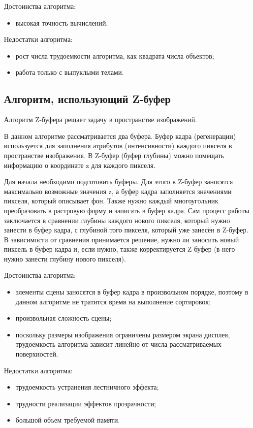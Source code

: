 Достоинства алгоритма:
\begin{itemize}
	\item высокая точность вычислений.
\end{itemize}

Недостатки алгоритма:
\begin{itemize}
	\item рост числа трудоемкости алгоритма, как квадрата числа объектов;
	\item работа только с выпуклыми телами.
\end{itemize}

\subsection{Алгоритм, использующий Z-буфер}

Алгоритм Z-буфера решает задачу в пространстве изображений. 

В данном алгоритме рассматривается два буфера. Буфер кадра (регенерации) используется для заполнения атрибутов (интенсивности) каждого пикселя в пространстве изображения. В Z-буфер (буфер глубины) можно помещать информацию о координате z для каждого пикселя.

Для начала необходимо подготовить буферы. Для этого в Z-буфер заносятся максимально возможные значения z, а буфер кадра заполняется значениями пикселя, который описывает фон. Также нужно каждый многоугольник преобразовать в растровую форму и записать в буфер кадра. Сам процесс работы заключается в сравнении глубины каждого нового пикселя, который нужно занести в буфер кадра,
с глубиной того пикселя, который уже занесён в Z-буфер. В зависимости от сравнения принимается решение, нужно ли заносить новый пиксель в буфер кадра и, если нужно, также корректируется Z-буфер (в него нужно занести глубину нового пикселя).

Достоинства алгоритма:
\begin{itemize}
	\item элементы сцены заносятся в буфер кадра в произвольном порядке, поэтому в данном алгоритме не тратится время на выполнение сортировок;
	\item произвольная сложность сцены;
	\item поскольку размеры изображения ограничены размером экрана дисплея, трудоемкость алгоритма зависит линейно от числа рассматриваемых поверхностей.
\end{itemize}

Недостатки алгоритма:
\begin{itemize}
	\item трудоемкость устранения лестничного эффекта;
	\item трудности реализации эффектов прозрачности;
	\item большой объем требуемой памяти.
\end{itemize}


